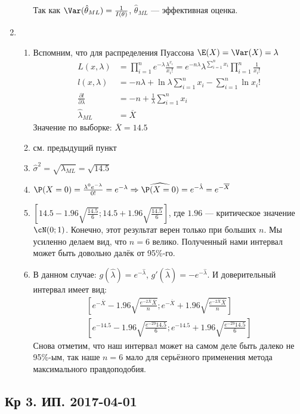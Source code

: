\begin{enumerate}
\begin{enumerate}
  Так как $\Var(\hat{\theta}_{ML}) = \frac{1}{I(\theta)}$, $\hat{\theta}_{ML}$ — эффективная оценка.
\end{enumerate}
\item
\begin{enumerate}
\item Вспомним, что для распределения Пуассона $\E(X) = \Var(X) = \lambda$
\begin{align*}
  L(x, \lambda) &= \prod_{i=1}^n e^{-\lambda} \frac{\lambda^{x_i}}{x_i!} = e^{-n\lambda} \lambda^{\sum_{i=1}^n x_i} \prod_{i=1}^n \frac{1}{x_i!} \\
  l(x, \lambda) &= -n\lambda + \ln\lambda \sum_{i=1}^n x_i - \sum_{i=1}^n \ln x_i! \\
  \frac{\partial l}{\partial \lambda} &= -n + \frac{1}{\lambda} \sum_{i=1}^n x_i \\
  \hat{\lambda}_{ML} &= \overline{X}
\end{align*}
Значение по выборке: $\overline{X} = 14.5$
\item см. предыдущий пункт
\item $\hat \sigma^2 = \sqrt{\lambda_{ML}} = \sqrt{14.5}$
\item $\P(X=0) = \frac{\lambda^0 e^{-\lambda}}{0!} = e^{-\lambda} \Rightarrow \widehat{\P(X=0)} = e^{-\hat\lambda} = e^{-\overline{X}}$
\item $\left[14.5 - 1.96 \sqrt{\frac{14.5}{6}}; 14.5 + 1.96 \sqrt{\frac{14.5}{6}}\right]$, где $1.96$ — критическое значение $\cN(0;1)$. Конечно, этот результат верен только при больших $n$. Мы усиленно делаем вид, что $n=6$ велико. Полученный нами интервал может быть довольно далёк от 95\%-го.
\item В данном случае: $g(\hat{\lambda}) = e^{-\hat\lambda}$, $g'(\hat\lambda) = -e^{-\hat\lambda}$.
И доверительный интервал имеет вид:
\begin{align*}
  \left[e^{-\overline{X}} - 1.96 \sqrt{\frac{e^{-2\overline{X}}\overline{X}}{n}}; e^{-\overline{X}} + 1.96 \sqrt{\frac{e^{-2\overline{X}}\overline{X}}{n}} \right] \\
  \left[e^{-14.5} - 1.96 \sqrt{\frac{e^{-29}14.5}{6}}; e^{-14.5} + 1.96 \sqrt{\frac{e^{-29}14.5}{6}} \right]
\end{align*}
Снова отметим, что наш интервал может на самом деле быть далеко не 95\%-ым, так наше $n=6$ мало для серьёзного применения метода максимального правдоподобия.
\end{enumerate}
\end{enumerate}


\subsection{Кр 3. ИП. 2017-04-01}

